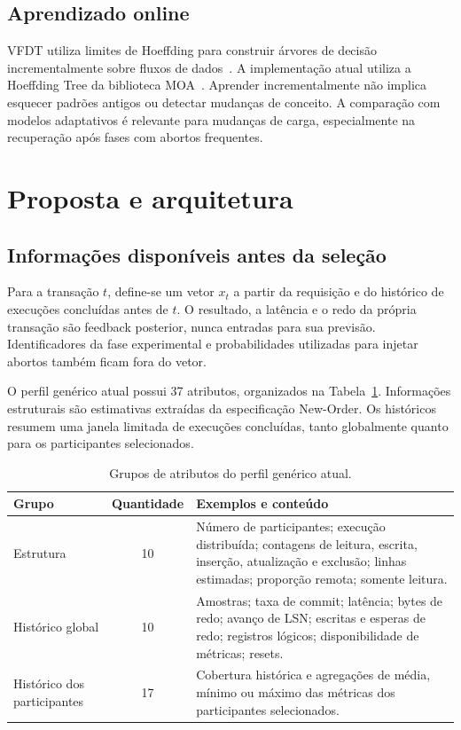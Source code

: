 \documentclass[12pt,a4paper]{article}
\begin{document}
\subsection{Aprendizado online}
VFDT utiliza limites de Hoeffding para construir árvores de decisão incrementalmente sobre fluxos de dados~\cite{domingos2000}. A implementação atual utiliza a Hoeffding Tree da biblioteca MOA~\cite{bifet2010}. Aprender incrementalmente não implica esquecer padrões antigos ou detectar mudanças de conceito. A comparação com modelos adaptativos é relevante para mudanças de carga, especialmente na recuperação após fases com abortos frequentes.

\section{Proposta e arquitetura}
\subsection{Informações disponíveis antes da seleção}
Para a transação $t$, define-se um vetor $x_t$ a partir da requisição e do histórico de execuções concluídas antes de $t$. O resultado, a latência e o redo da própria transação são feedback posterior, nunca entradas para sua previsão. Identificadores da fase experimental e probabilidades utilizadas para injetar abortos também ficam fora do vetor.

O perfil genérico atual possui 37 atributos, organizados na Tabela~\ref{tab:features}. Informações estruturais são estimativas extraídas da especificação New-Order. Os históricos resumem uma janela limitada de execuções concluídas, tanto globalmente quanto para os participantes selecionados.

\begin{table}[htbp]
\centering\small
\caption{Grupos de atributos do perfil genérico atual.}
\label{tab:features}
\begin{tabular}{p{3cm}cp{8cm}}
\toprule Grupo & Quantidade & Exemplos e conteúdo \\
\midrule
Estrutura & 10 & Número de participantes; execução distribuída; contagens de leitura, escrita, inserção, atualização e exclusão; linhas estimadas; proporção remota; somente leitura. \\
Histórico global & 10 & Amostras; taxa de commit; latência; bytes de redo; avanço de LSN; escritas e esperas de redo; registros lógicos; disponibilidade de métricas; resets. \\
Histórico dos participantes & 17 & Cobertura histórica e agregações de média, mínimo ou máximo das métricas dos participantes selecionados. \\
\bottomrule
\end{tabular}
\end{table}
\end{document}

